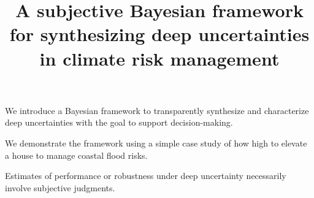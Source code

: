 \documentclass{agujournal2019}
\begin{document}
%
%


\title{A subjective Bayesian framework for synthesizing deep uncertainties in climate risk management}

%
%






\begin{keypoints}
  \item We introduce a Bayesian framework to transparently synthesize and characterize deep uncertainties with the goal to support decision-making.
  \item We demonstrate the framework using a simple case study of how high to elevate a  house to manage coastal flood risks.
  \item Estimates of performance or robustness under deep uncertainty necessarily involve subjective judgments.
\end{keypoints}
\end{document}
